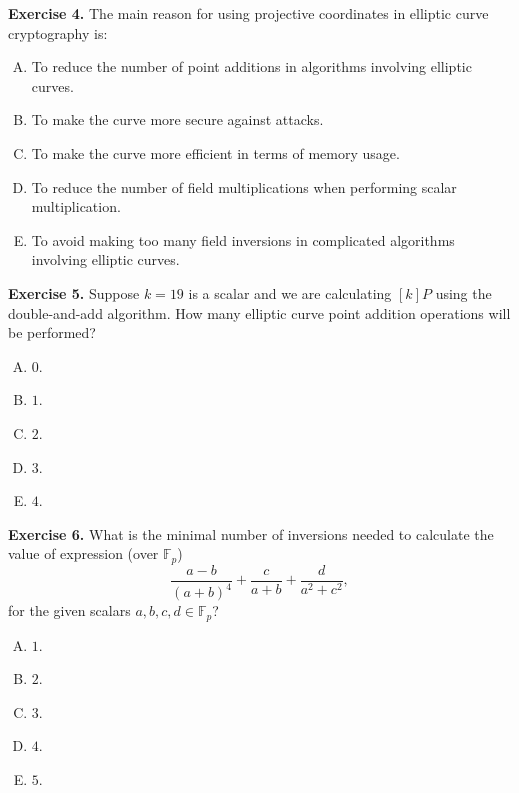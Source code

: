 \documentclass[../lecture-notes.tex]{subfiles}
\begin{document}
\textbf{Exercise 4.} The main reason for using projective coordinates in elliptic curve cryptography is:
\begin{enumerate}[(A)]
    \item To reduce the number of point additions in algorithms involving elliptic curves.
    \item To make the curve more secure against attacks.
    \item To make the curve more efficient in terms of memory usage.
    \item To reduce the number of field multiplications when performing scalar multiplication.
    \item To avoid making too many field inversions in complicated algorithms involving elliptic curves.
\end{enumerate}

\textbf{Exercise 5.} Suppose $k=19$ is a scalar and we are calculating $[k]P$ using the double-and-add algorithm. How many elliptic curve point addition operations will be performed?
\begin{multicols}{5}
    \begin{enumerate}[(A)]
        \item $0$.
        \item $1$.
        \item $2$.
        \item $3$.
        \item $4$.
    \end{enumerate}
\end{multicols}

\textbf{Exercise 6.} What is the minimal number of inversions needed to calculate the value of expression (over $\mathbb{F}_p$)
\begin{equation*}
    \frac{a-b}{(a+b)^4} + \frac{c}{a+b} + \frac{d}{a^2+c^2},
\end{equation*}
for the given scalars $a,b,c,d \in \mathbb{F}_p$?
\begin{multicols}{5}
    \begin{enumerate}[(A)]
        \item $1$.
        \item $2$.
        \item $3$.
        \item $4$.
        \item $5$.
    \end{enumerate}
\end{multicols}
\end{document}
